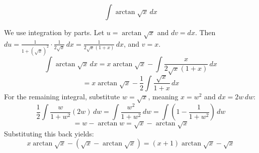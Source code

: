 \begin{questions}
    \question
    \[ \int \arctan \sqrt{x} \, dx \]
    \begin{solution}
        We use integration by parts. Let $u = \arctan \sqrt{x}$ and $dv = dx$. 
        Then $du = \frac{1}{1 + (\sqrt{x})^2} \cdot \frac{1}{2\sqrt{x}} \, dx = \frac{1}{2\sqrt{x}(1 + x)} \, dx$, and $v = x$.
        \[ \int \arctan \sqrt{x} \, dx = x \arctan \sqrt{x} - \int \frac{x}{2\sqrt{x}(1 + x)} \, dx \]
        \[ = x \arctan \sqrt{x} - \frac{1}{2} \int \frac{\sqrt{x}}{1 + x} \, dx \]
        For the remaining integral, substitute $w = \sqrt{x}$, meaning $x = w^2$ and $dx = 2w \, dw$:
        \[ \frac{1}{2} \int \frac{w}{1 + w^2} (2w) \, dw = \int \frac{w^2}{1 + w^2} \, dw = \int \left( 1 - \frac{1}{1 + w^2} \right) \, dw \]
        \[ = w - \arctan w = \sqrt{x} - \arctan \sqrt{x} \]
        Substituting this back yields:
        \[ x \arctan \sqrt{x} - (\sqrt{x} - \arctan \sqrt{x}) = (x + 1) \arctan \sqrt{x} - \sqrt{x} \]
    \end{solution}
\end{questions}